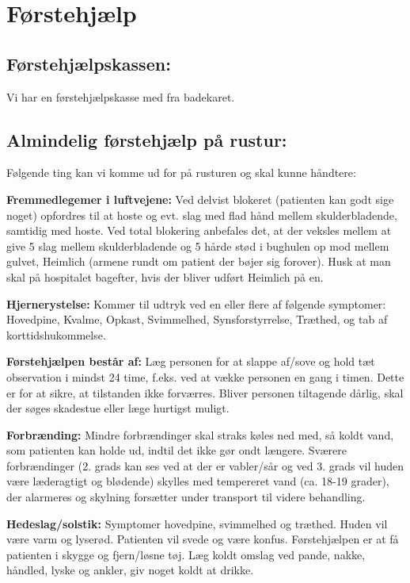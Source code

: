 \documentclass[../../../main.tex]{subfiles}
\begin{document}
\section{Førstehjælp}
\subsection{Førstehjælpskassen:}
Vi har en førstehjælpskasse med fra badekaret.


\subsection{Almindelig førstehjælp på rustur:}
Følgende ting kan vi komme ud for på rusturen og skal kunne håndtere:


\textbf{Fremmedlegemer i luftvejene:} Ved delvist blokeret (patienten kan godt sige noget) opfordres til at hoste og evt. slag med flad hånd mellem skulderbladende, samtidig med hoste. Ved total blokering anbefales det, at der veksles mellem at give 5 slag mellem skulderbladende og 5 hårde stød i bughulen op mod mellem gulvet, Heimlich (armene rundt om patient der bøjer sig forover). Husk at man skal på hospitalet bagefter, hvis der bliver udført Heimlich på en.


\textbf{Hjernerystelse:} Kommer til udtryk ved en eller flere af følgende symptomer: Hovedpine, Kvalme, Opkast, Svimmelhed, Synsforstyrrelse, Træthed, og tab af korttidshukommelse.


\textbf{Førstehjælpen består af:} Læg personen for at slappe af/sove og hold tæt observation i mindst 24 time, f.eks. ved at vække personen en gang i timen. Dette er for at sikre, at tilstanden ikke forværres. Bliver personen tiltagende dårlig, skal der søges skadestue eller læge hurtigst muligt.


\textbf{Forbrænding:} Mindre forbrændinger skal straks køles ned med, så koldt vand, som patienten kan holde ud, indtil det ikke gør ondt længere. Sværere forbrændinger (2. grads kan ses ved at der er vabler/sår og ved 3. grads vil huden være læderagtigt og blødende) skylles med tempereret vand (ca. 18-19 grader), der alarmeres og skylning forsætter under transport til videre behandling. 


\textbf{Hedeslag/solstik:} Symptomer hovedpine, svimmelhed og træthed. Huden vil være varm og lyserød. Patienten vil svede og være konfus. Førstehjælpen er at få patienten i skygge og fjern/løsne tøj. Læg koldt omslag ved pande, nakke, håndled, lyske og ankler, giv noget koldt at drikke. 
\end{document}
